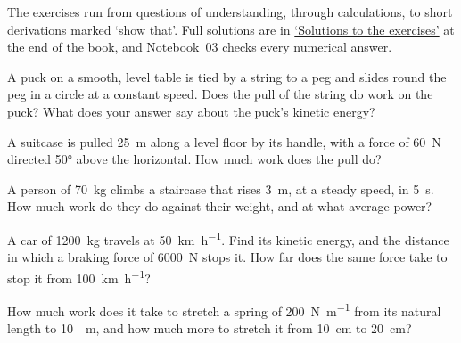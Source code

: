 \label{sec:en-exercises}

The exercises run from questions of understanding, through calculations,
to short derivations marked `show that'. Full solutions are in
\hyperref[sec:en-solutions]{`Solutions to the exercises'} at the end of
the book, and Notebook~03 checks every numerical answer.

\begin{exercise}
\label{ex:en-circle}
A puck on a smooth, level table is tied by a string to a peg and slides
round the peg in a circle at a constant speed. Does the pull of the string
do work on the puck? What does your answer say about the puck's kinetic
energy?
\end{exercise}

\begin{exercise}[a suitcase]
\label{ex:en-suitcase}
A suitcase is pulled \SI{25}{\metre} along a level floor by its handle,
with a force of \SI{60}{\newton} directed \ang{50} above the horizontal.
How much work does the pull do?
\end{exercise}

\begin{exercise}[stairs]
\label{ex:en-stairs}
A person of \SI{70}{\kilogram} climbs a staircase that rises
\SI{3}{\metre}, at a steady speed, in \SI{5}{\second}. How much work do
they do against their weight, and at what average power?
\end{exercise}

\begin{exercise}[braking]
\label{ex:en-braking}
A car of \SI{1200}{\kilogram} travels at \SI{50}{\kilo\metre\per\hour}.
Find its kinetic energy, and the distance in which a braking force of
\SI{6000}{\newton} stops it. How far does the same force take to stop it
from \SI{100}{\kilo\metre\per\hour}?
\end{exercise}

\begin{exercise}
\label{ex:en-stretch}
How much work does it take to stretch a spring of
\SI{200}{\newton\per\metre} from its natural length to \SI{10}{\centi
\metre}, and how much more to stretch it from \SI{10}{\centi\metre} to
\SI{20}{\centi\metre}?
\end{exercise}

